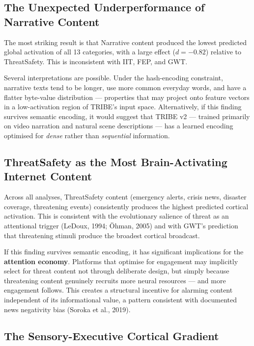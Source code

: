 \documentclass[11pt,letterpaper]{article}
\begin{document}
\subsection{The Unexpected Underperformance of Narrative Content}

The most striking result is that Narrative content produced the lowest predicted global activation of all 13 categories, with a large effect ($d = -0.82$) relative to ThreatSafety. This is inconsistent with IIT, FEP, and GWT.

Several interpretations are possible. Under the hash-encoding constraint, narrative texts tend to be longer, use more common everyday words, and have a flatter byte-value distribution --- properties that may project onto feature vectors in a low-activation region of TRIBE's input space. Alternatively, if this finding survives semantic encoding, it would suggest that TRIBE v2 --- trained primarily on video narration and natural scene descriptions --- has a learned encoding optimised for \textit{dense} rather than \textit{sequential} information.

\subsection{ThreatSafety as the Most Brain-Activating Internet Content}

Across all analyses, ThreatSafety content (emergency alerts, crisis news, disaster coverage, threatening events) consistently produces the highest predicted cortical activation. This is consistent with the evolutionary salience of threat as an attentional trigger (LeDoux, 1994; \"{O}hman, 2005) and with GWT's prediction that threatening stimuli produce the broadest cortical broadcast.

If this finding survives semantic encoding, it has significant implications for the \textbf{attention economy}. Platforms that optimise for engagement may implicitly select for threat content not through deliberate design, but simply because threatening content genuinely recruits more neural resources --- and more engagement follows. This creates a structural incentive for alarming content independent of its informational value, a pattern consistent with documented news negativity bias (Soroka et al., 2019).

\subsection{The Sensory-Executive Cortical Gradient}
\end{document}
